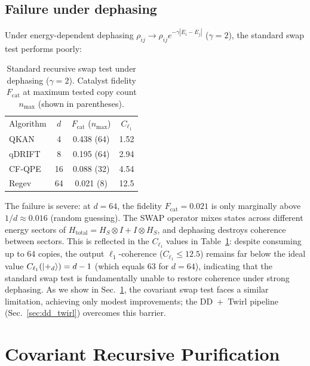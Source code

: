 \documentclass[prx,twocolumn,superscriptaddress,longbibliography,floatfix]{revtex4-2}
\begin{document}
\subsection{Failure under dephasing}
\label{sec:standard_deph}

Under energy-dependent dephasing $\rho_{ij} \to \rho_{ij} e^{-\gamma|E_i - E_j|}$ ($\gamma = 2$), the standard swap test performs poorly:

\begin{table}[tb]
\caption{Standard recursive swap test under dephasing ($\gamma = 2$). Catalyst fidelity $F_\mathrm{cat}$ at maximum tested copy count $n_\mathrm{max}$ (shown in parentheses).}
\label{tab:standard_deph}
\begin{ruledtabular}
\begin{tabular}{lccc}
Algorithm & $d$ & $F_\mathrm{cat}$ ($n_\mathrm{max}$) & $C_{\ell_1}$ \\
\colrule
QKAN & 4 & 0.438 (64) & 1.52 \\
qDRIFT & 8 & 0.195 (64) & 2.94 \\
CF-QPE & 16 & 0.088 (32) & 4.54 \\
Regev & 64 & 0.021 (8) & 12.5 \\
\end{tabular}
\end{ruledtabular}
\end{table}

The failure is severe: at $d = 64$, the fidelity $F_\mathrm{cat} = 0.021$ is only marginally above $1/d \approx 0.016$ (random guessing).
The SWAP operator mixes states across different energy sectors of $H_\mathrm{total} = H_S \otimes I + I \otimes H_S$, and dephasing destroys coherence between sectors.
This is reflected in the $C_{\ell_1}$ values in Table~\ref{tab:standard_deph}: despite consuming up to 64 copies, the output $\ell_1$-coherence ($C_{\ell_1} \leq 12.5$) remains far below the ideal value $C_{\ell_1}(\ket{+_d}) = d-1$ (which equals 63 for $d = 64$), indicating that the standard swap test is fundamentally unable to restore coherence under strong dephasing.
As we show in Sec.~\ref{sec:covariant}, the covariant swap test faces a similar limitation, achieving only modest improvements; the DD~+~Twirl pipeline (Sec.~\ref{sec:dd_twirl}) overcomes this barrier.


\section{Covariant Recursive Purification}
\label{sec:covariant}
\end{document}

